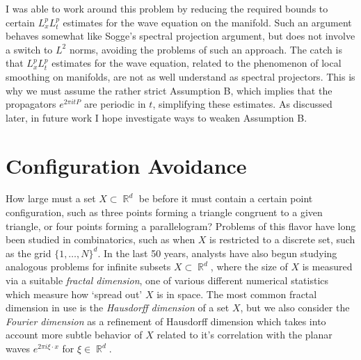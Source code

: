 \documentclass[11pt]{article}
\DeclareMathOperator{\RR}{\mathbb{R}}
\begin{document}
I was able to work around this problem by reducing the required bounds to certain $L^p_x L^p_t$ estimates for the wave equation on the manifold. Such an argument behaves somewhat like Sogge's spectral projection argument, but does not involve a switch to $L^2$ norms, avoiding the problems of such an approach. The catch is that $L^p_x L^p_t$ estimates for the wave equation, related to the phenomenon of local smoothing on manifolds, are not as well understand as spectral projectors. This is why we must assume the rather strict Assumption B, which implies that the propagators $e^{2 \pi i t P}$ are periodic in $t$, simplifying these estimates. As discussed later, in future work I hope investigate ways to weaken Assumption B.


\section{Configuration Avoidance} \label{Section2}

How large must a set $X \subset \RR^d$ be before it must contain a certain point configuration, such as three points forming a triangle congruent to a given triangle, or four points forming a parallelogram? Problems of this flavor have long been studied in combinatorics, such as when $X$ is restricted to a discrete set, such as the grid $\{ 1, \dots, N \}^d$. In the last 50 years, analysts have also begun studying analogous problems for infinite subsets $X \subset \RR^d$, where the size of $X$ is measured via a suitable \emph{fractal dimension}, one of various different numerical statistics which measure how `spread out' $X$ is in space. The most common fractal dimension in use is the \emph{Hausdorff dimension} of a set $X$, but we also consider the \emph{Fourier dimension} as a refinement of Hausdorff dimension which takes into account more subtle behavior of $X$ related to it's correlation with the planar waves $e^{2 \pi i \xi \cdot x}$ for $\xi \in \RR^d$. 
\end{document}
